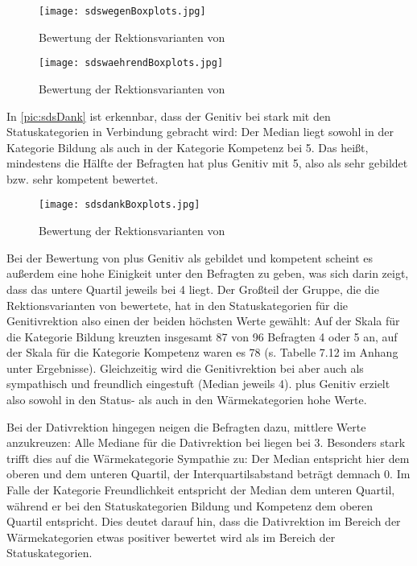 \begin{figure}
\centering
\texttt{[image: sdswegenBoxplots.jpg]}
\caption{Bewertung der Rektionsvarianten von \wegen}
\label{pic:sdsWegen}
\end{figure}

\begin{figure}
\centering
\texttt{[image: sdswaehrendBoxplots.jpg]}
\caption{Bewertung der Rektionsvarianten von \waehrend}
\label{pic:sdsWaehrend}
\end{figure}
 
In \autoref{pic:sdsDank} ist erkennbar, dass der Genitiv bei \dank{} stark mit den Statuskategorien in Verbindung gebracht wird: 
Der Median liegt sowohl in der Kategorie \glqq Bildung\grqq{} als auch in der Kategorie \glqq Kompetenz\grqq{} bei 5.
Das heißt, mindestens die Hälfte der Befragten hat \dank{} plus Genitiv mit 5, also als sehr gebildet bzw. sehr kompetent bewertet.
\begin{figure}
\centering
\texttt{[image: sdsdankBoxplots.jpg]}
\caption{Bewertung der Rektionsvarianten von \dank}
\label{pic:sdsDank}
\end{figure}

Bei der Bewertung von \dank{} plus Genitiv als gebildet und kompetent scheint es außerdem eine hohe Einigkeit unter den Befragten zu geben, was sich darin zeigt, dass das untere Quartil jeweils bei 4 liegt. 
Der Großteil der Gruppe, die die Rektionsvarianten von \dank{} bewertete, hat in den Statuskategorien für die Genitivrektion also einen der beiden höchsten Werte gewählt: 
Auf der Skala für die Kategorie Bildung kreuzten insgesamt 87 von 96 Befragten 4 oder 5 an, auf der Skala für die Kategorie Kompetenz waren es 78 (s. Tabelle 7.12 im Anhang unter Ergebnisse). 
Gleichzeitig wird die Genitivrektion bei \dank{} aber auch als sympathisch und freundlich eingestuft (Median jeweils 4). 
 plus Genitiv erzielt also sowohl in den Status- als auch in den Wärmekategorien hohe Werte. 

Bei der Dativrektion hingegen neigen die Befragten dazu, mittlere Werte anzukreuzen:
Alle Mediane für die Dativrektion bei \dank{} liegen bei 3. 
Besonders stark trifft dies auf die Wärmekategorie Sympathie zu: 
Der Median entspricht hier dem oberen und dem unteren Quartil, der Interquartilsabstand beträgt demnach 0. 
Im Falle der Kategorie Freundlichkeit entspricht der Median dem unteren Quartil, während er bei den Statuskategorien Bildung und Kompetenz dem oberen Quartil entspricht. 
Dies deutet darauf hin, dass die Dativrektion im Bereich der Wärmekategorien etwas positiver bewertet wird als im Bereich der Statuskategorien.

